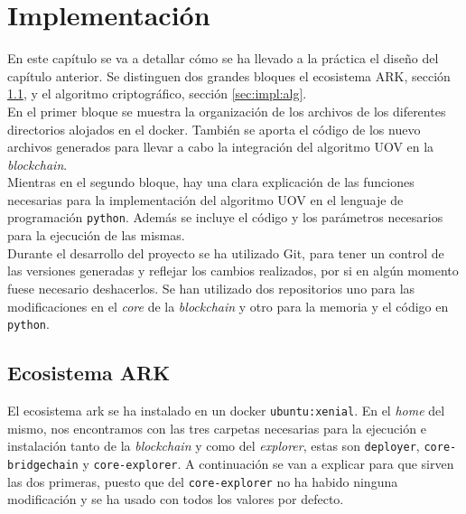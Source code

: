 \chapter{Implementación}
\label{sec:implementacion}

En este capítulo se va a detallar cómo se ha llevado a la práctica el diseño del capítulo anterior. Se distinguen dos grandes bloques el ecosistema ARK, sección \ref{sec:impl:eco}, y el algoritmo criptográfico, sección \ref{sec:impl:alg}.\\

En el primer bloque se muestra la organización de los archivos de los diferentes directorios alojados en el docker. También se aporta el código de los nuevo archivos generados para llevar a cabo la integración del algoritmo UOV en la \textit{blockchain}.\\

Mientras en el segundo bloque, hay una clara explicación de las funciones necesarias para la implementación del algoritmo UOV en el lenguaje de programación \texttt{python}. Además se incluye el código y los parámetros necesarios para la ejecución de las mismas.\\


Durante el desarrollo del proyecto se ha utilizado Git, para tener un control de las versiones generadas y reflejar los cambios realizados, por si en algún momento fuese necesario deshacerlos. Se han utilizado dos repositorios uno para las modificaciones en el \textit{core} de la \textit{blockchain}\cite{core-mv} y otro para la memoria y el código en \texttt{python}\cite{git-mv}.

\section{Ecosistema ARK}\label{sec:impl:eco}

El ecosistema ark se ha instalado en un docker \texttt{ubuntu:xenial}. En el \textit{home} del mismo, nos encontramos con las tres carpetas necesarias para la ejecución e instalación tanto de la \textit{blockchain} y como del \textit{explorer}, estas son \texttt{deployer}, \texttt{core-bridgechain} y \texttt{core-explorer}. A continuación se van a explicar para que sirven las dos primeras, puesto que del \texttt{core-explorer} no ha habido ninguna modificación y se ha usado con todos los valores por defecto.\\



